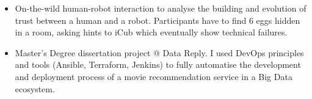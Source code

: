 \begin{itemize}
\item On-the-wild human-robot interaction to analyse the building and evolution of trust between a human and a robot. Participants have to find 6 eggs hidden in a room, asking hints to iCub which eventually show technical failures.
\end{itemize}
\smallskip

\begin{itemize}
\item Master's Degree dissertation project @ Data Reply. I used DevOps principles and tools (Ansible, Terraform, Jenkins) to fully automatise the development and deployment process of a movie recommendation service in a Big Data ecosystem.
\end{itemize}
\smallskip
\smallskip
\cvproject{}
